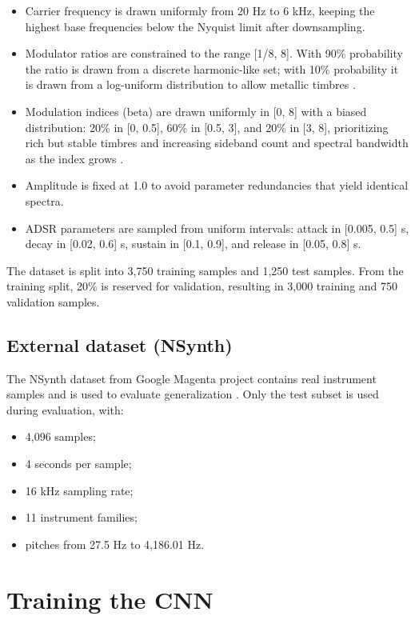 \begin{itemize}
  \item Carrier frequency is drawn uniformly from 20 Hz to 6 kHz, keeping the highest base frequencies below the Nyquist limit after downsampling.
  \item Modulator ratios are constrained to the range [1/8, 8]. With 90\% probability the ratio is drawn from a discrete harmonic-like set; with 10\% probability it is drawn from a log-uniform distribution to allow metallic timbres \cite{chowning1973synthesis,nielsen2020practical}.
  \item Modulation indices (beta) are drawn uniformly in [0, 8] with a biased distribution: 20\% in [0, 0.5], 60\% in [0.5, 3], and 20\% in [3, 8], prioritizing rich but stable timbres and increasing sideband count and spectral bandwidth as the index grows \cite{chowning1973synthesis,nielsen2020practical}.
  \item Amplitude is fixed at 1.0 to avoid parameter redundancies that yield identical spectra.
  \item ADSR parameters are sampled from uniform intervals: attack in [0.005, 0.5] s, decay in [0.02, 0.6] s, sustain in [0.1, 0.9], and release in [0.05, 0.8] s.
\end{itemize}

The dataset is split into 3,750 training samples and 1,250 test samples. From the training split, 20\% is reserved for validation, resulting in 3,000 training and 750 validation samples.

\subsection{External dataset (NSynth)}

The NSynth dataset from Google Magenta project contains real instrument samples and is used to evaluate generalization \cite{engel2017nsynth}. Only the test subset is used during evaluation, with:

\begin{itemize}
  \item 4,096 samples;
  \item 4 seconds per sample;
  \item 16 kHz sampling rate;
  \item 11 instrument families;
  \item pitches from 27.5 Hz to 4,186.01 Hz.
\end{itemize}

\section{Training the CNN}
\label{sec:training_cnn}


